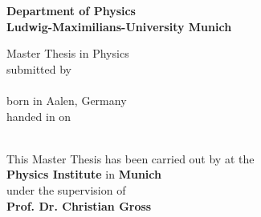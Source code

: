 \begin{titlepage}
\begin{center}
\makeatletter

\Large\textbf{Department of Physics\\
Ludwig-Maximilians-University Munich}

\vfill

\normalsize
Master Thesis in Physics\\
\normalsize
submitted by\\[0.5cm]
\Large
\textbf{\@author}\\
\normalsize
born in Aalen, Germany\\[0.5cm]
\normalsize
handed in on\\
\Large
\textbf{\@date}\\[0.5cm]
\normalsize


\cleardoublepage
\thispagestyle{empty}


\LARGE\textbf{\@title}

\vfill

\normalsize
This Master Thesis has been carried out by \@author{} at the\\
\textbf{Physics Institute} in \textbf{Munich}\\
under the supervision of\\
\textbf{Prof. Dr. Christian Gross}

\makeatother
\end{center}
\end{titlepage}
